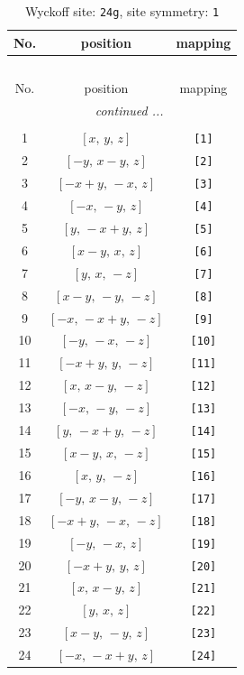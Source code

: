 \documentclass[fleqn,8pt]{jsarticle}
\begin{document}
\begin{longtable}{ccc}
\caption{Wyckoff site: {\tt 24g}, site symmetry: {\tt 1}}
 \\
 \hline \hline
No. & position & mapping \\ \hline \endfirsthead

\multicolumn{2}{l}{\tablename\ \thetable{}} \\
 \hline \hline
No. & position & mapping \\ \hline \endhead

 \hline \hline
\multicolumn{2}{r}{\footnotesize\it continued ...} \\ \endfoot

 \hline \hline
\multicolumn{2}{r}{} \\ \endlastfoot

1 & $\left[ x,\, y,\, z \right]$ & {\tt [1]} \\ \hline
2 & $\left[ - y,\, x - y,\, z \right]$ & {\tt [2]} \\ \hline
3 & $\left[ - x + y,\, - x,\, z \right]$ & {\tt [3]} \\ \hline
4 & $\left[ - x,\, - y,\, z \right]$ & {\tt [4]} \\ \hline
5 & $\left[ y,\, - x + y,\, z \right]$ & {\tt [5]} \\ \hline
6 & $\left[ x - y,\, x,\, z \right]$ & {\tt [6]} \\ \hline
7 & $\left[ y,\, x,\, - z \right]$ & {\tt [7]} \\ \hline
8 & $\left[ x - y,\, - y,\, - z \right]$ & {\tt [8]} \\ \hline
9 & $\left[ - x,\, - x + y,\, - z \right]$ & {\tt [9]} \\ \hline
10 & $\left[ - y,\, - x,\, - z \right]$ & {\tt [10]} \\ \hline
11 & $\left[ - x + y,\, y,\, - z \right]$ & {\tt [11]} \\ \hline
12 & $\left[ x,\, x - y,\, - z \right]$ & {\tt [12]} \\ \hline
13 & $\left[ - x,\, - y,\, - z \right]$ & {\tt [13]} \\ \hline
14 & $\left[ y,\, - x + y,\, - z \right]$ & {\tt [14]} \\ \hline
15 & $\left[ x - y,\, x,\, - z \right]$ & {\tt [15]} \\ \hline
16 & $\left[ x,\, y,\, - z \right]$ & {\tt [16]} \\ \hline
17 & $\left[ - y,\, x - y,\, - z \right]$ & {\tt [17]} \\ \hline
18 & $\left[ - x + y,\, - x,\, - z \right]$ & {\tt [18]} \\ \hline
19 & $\left[ - y,\, - x,\, z \right]$ & {\tt [19]} \\ \hline
20 & $\left[ - x + y,\, y,\, z \right]$ & {\tt [20]} \\ \hline
21 & $\left[ x,\, x - y,\, z \right]$ & {\tt [21]} \\ \hline
22 & $\left[ y,\, x,\, z \right]$ & {\tt [22]} \\ \hline
23 & $\left[ x - y,\, - y,\, z \right]$ & {\tt [23]} \\ \hline
24 & $\left[ - x,\, - x + y,\, z \right]$ & {\tt [24]} \\
\end{longtable}
\end{document}
